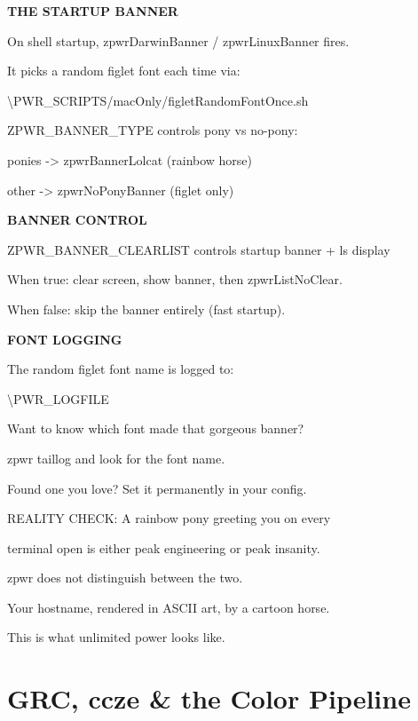 \documentclass[11pt,a4paper,twoside]{book}
\begin{document}
\vspace{12pt}
{\bfseries\color{neonyellow} THE STARTUP BANNER}\vspace{4pt}

On shell startup, zpwrDarwinBanner / zpwrLinuxBanner fires.

It picks a random figlet font each time via:

\textbackslash{}PWR\_SCRIPTS/macOnly/figletRandomFontOnce.sh

ZPWR\_BANNER\_TYPE controls pony vs no-pony:

ponies  -> zpwrBannerLolcat (rainbow horse)

other   -> zpwrNoPonyBanner (figlet only)


\vspace{12pt}
{\bfseries\color{neonyellow} BANNER CONTROL}\vspace{4pt}

ZPWR\_BANNER\_CLEARLIST  controls startup banner + ls display

When true: clear screen, show banner, then zpwrListNoClear.

When false: skip the banner entirely (fast startup).


\vspace{12pt}
{\bfseries\color{neonyellow} FONT LOGGING}\vspace{4pt}

The random figlet font name is logged to:

\textbackslash{}PWR\_LOGFILE

Want to know which font made that gorgeous banner?

zpwr taillog  and look for the font name.

Found one you love? Set it permanently in your config.

REALITY CHECK: A rainbow pony greeting you on every

terminal open is either peak engineering or peak insanity.

zpwr does not distinguish between the two.

Your hostname, rendered in ASCII art, by a cartoon horse.

This is what unlimited power looks like.


\vspace{16pt}

\section{GRC, ccze \& the Color Pipeline}
\end{document}
